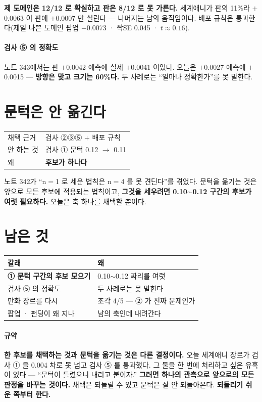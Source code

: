 \documentclass[10pt]{article}
\begin{document}
\textbf{제 도메인은 12/12 로 확실하고 판은 8/12 로 못 가른다.} 세계애니가
판의 11\%라 $+$0.0063 이 판에 $+$0.0007 만 실린다 --- 나머지는 남의
움직임이다. 배포 규칙은 통과한다(제일 나쁜 도메인 팝업 $-$0.0073 ·
짝SE 0.045 · $t{\approx}0.16$).

\paragraph{검사 ⑤ 의 정확도} 노트 343에서는 판 $+$0.0042 예측에 실제
$+$0.0041 이었다. 오늘은 $+$0.0027 예측에 $+$0.0015 --- \textbf{방향은
맞고 크기는 60\%다.} 두 사례로는 ``얼마나 정확한가''를 못 말한다.

\section{문턱은 안 옮긴다}

\begin{center}\small
\begin{tabular}{ll}
\hline
채택 근거 & 검사 ②③⑤ $+$ 배포 규칙 \\
안 하는 것 & 검사 ① 문턱 0.12 $\to$ 0.11 \\
왜 & \textbf{후보가 하나다} \\
\hline
\end{tabular}
\end{center}

노트 342가 ``n$=$1 로 세운 법칙은 n$=$4 를 못 견딘다''를 겪었다. 문턱을
옮기는 것은 앞으로 모든 후보에 적용되는 법칙이고, \textbf{그것을 세우려면
0.10$\sim$0.12 구간의 후보가 여럿 필요하다.} 오늘은 축 하나를 채택할
뿐이다.

\section{남은 것}
\begin{center}\footnotesize
\begin{tabular}{ll}
\hline
갈래 & 왜 \\
\hline
\textbf{① 문턱 구간의 후보 모으기} & 0.10$\sim$0.12 짜리를 여럿 \\
검사 ⑤ 의 정확도 & 두 사례로는 못 말한다 \\
만화 장르를 다시 & 조각 4/5 --- ② 가 진짜 문제인가 \\
팝업 · 펀딩이 왜 지나 & 남의 축인데 내려간다 \\
\hline
\end{tabular}
\end{center}

\paragraph{규약} \textbf{한 후보를 채택하는 것과 문턱을 옮기는 것은 다른
결정이다.} 오늘 세계애니 장르가 검사 ① 을 0.004 차로 못 넘고 검사 ⑤ 를
통과했다. 그 둘을 한 번에 처리하고 싶은 유혹이 있다 --- ``문턱이 틀렸으니
내리고 붙이자.'' \textbf{그러면 하나의 관측으로 앞으로의 모든 판정을
바꾸는 것이다.} 채택은 되돌릴 수 있고 문턱은 잘 안 되돌아온다.
\textbf{되돌리기 쉬운 쪽부터 한다.}
\end{document}

